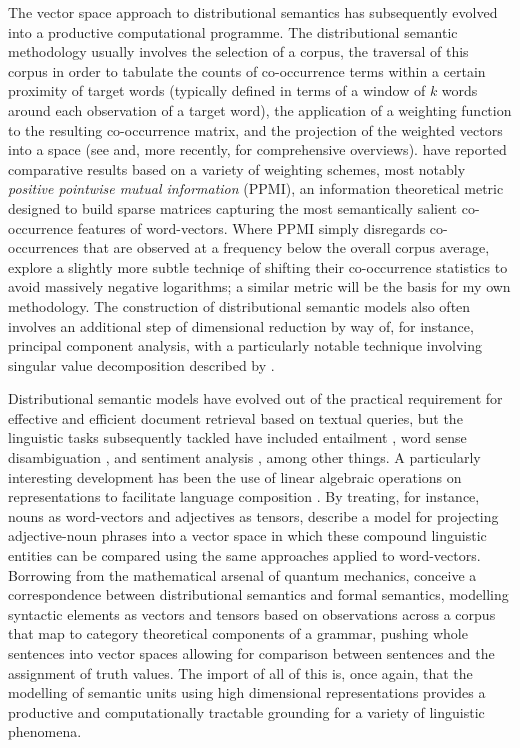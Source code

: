 The vector space approach to distributional semantics has subsequently evolved into a productive computational programme.  The distributional semantic methodology usually involves the selection of a corpus, the traversal of this corpus in order to tabulate the counts of co-occurrence terms within a certain proximity of target words (typically defined in terms of a window of $k$ words around each observation of a target word), the application of a weighting function to the resulting co-occurrence matrix, and the projection of the weighted vectors into a space (see \citealt{TurneyEA2010} and, more recently, \citealt{Clark2015} for comprehensive overviews).  \cite{BullinariaEA2012} have reported comparative results based on a variety of weighting schemes, most notably \emph{positive pointwise mutual information} (PPMI), an information theoretical metric designed to build sparse matrices capturing the most semantically salient co-occurrence features of word-vectors.  Where PPMI simply disregards co-occurrences that are observed at a frequency below the overall corpus average, \cite{LevyEA2015b} explore a slightly more subtle techniqe of shifting their co-occurrence statistics to avoid massively negative logarithms; a similar metric will be the basis for my own methodology.  The construction of distributional semantic models also often involves an additional step of dimensional reduction by way of, for instance, principal component analysis, with a particularly notable technique involving singular value decomposition described by \cite{DeerwesterEA1990}.

Distributional semantic models have evolved out of the practical requirement for effective and efficient document retrieval based on textual queries, but the linguistic tasks subsequently tackled have included entailment \citep{GeffetEA2005,BaroniEA2012,Rimell2014}, word sense disambiguation \citep{Schutze1998,KartsaklisEA2013}, and sentiment analysis \citep{MalandrakisEA2013,DosSantosEA2014}, among other things.  A particularly interesting development has been the use of linear algebraic operations on representations to facilitate language composition \citep{MitchellEA2010}.  By treating, for instance, nouns as word-vectors and adjectives as tensors, \cite{BaroniEA2010} describe a model for projecting adjective-noun phrases into a vector space in which these compound linguistic entities can be compared using the same approaches applied to word-vectors.  Borrowing from the mathematical arsenal of quantum mechanics, \cite{CoeckeEA2011} conceive a correspondence between distributional semantics and formal semantics, modelling syntactic elements as vectors and tensors based on observations across a corpus that map to category theoretical components of a grammar, pushing whole sentences into vector spaces allowing for comparison between sentences and the assignment of truth values.  The import of all of this is, once again, that the modelling of semantic units using high dimensional representations provides a productive and computationally tractable grounding for a variety of linguistic phenomena.

